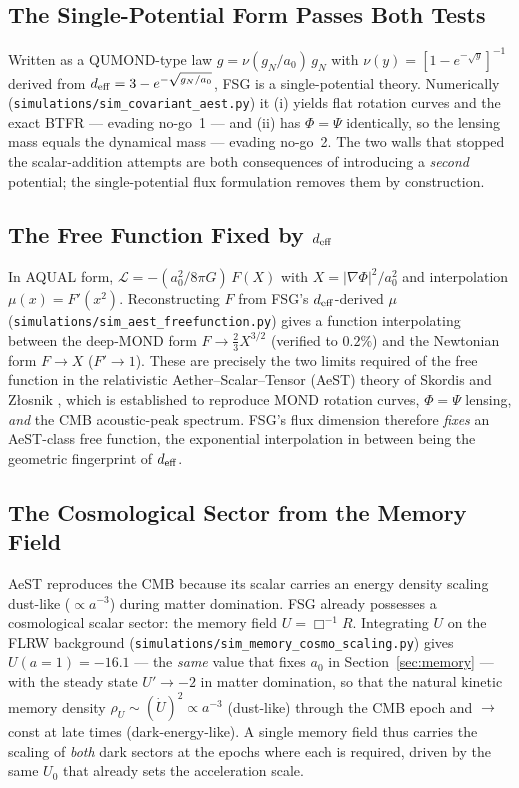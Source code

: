 \documentclass[11pt,a4paper]{article}
\begin{document}
\begin{onehalfspacing}
\subsection{The Single-Potential Form Passes Both Tests}
Written as a QUMOND-type law $g=\nu(g_N/a_0)\,g_N$ with $\nu(y)=[1-e^{-\sqrt{y}}]^{-1}$ derived from $d_{\rm eff}=3-e^{-\sqrt{g_N/a_0}}$, FSG is a single-potential theory. Numerically (\texttt{simulations/sim\_covariant\_aest.py}) it (i) yields flat rotation curves and the exact BTFR --- evading no-go~1 --- and (ii) has $\Phi=\Psi$ identically, so the lensing mass equals the dynamical mass --- evading no-go~2. The two walls that stopped the scalar-addition attempts are both consequences of introducing a \emph{second} potential; the single-potential flux formulation removes them by construction.

\subsection{The Free Function Fixed by $d_{\rm eff}$}
In AQUAL form, $\mathcal{L}=-(a_0^2/8\pi G)\,F(X)$ with $X=|\nabla\Phi|^2/a_0^2$ and interpolation $\mu(x)=F'(x^2)$. Reconstructing $F$ from FSG's $d_{\rm eff}$-derived $\mu$ (\texttt{simulations/sim\_aest\_freefunction.py}) gives a function interpolating between the deep-MOND form $F\to\tfrac{2}{3}X^{3/2}$ (verified to $0.2\%$) and the Newtonian form $F\to X$ ($F'\to1$). These are precisely the two limits required of the free function in the relativistic Aether--Scalar--Tensor (AeST) theory of Skordis and Z\l osnik \cite{SkordisZlosnik2021}, which is established to reproduce MOND rotation curves, $\Phi=\Psi$ lensing, \emph{and} the CMB acoustic-peak spectrum. FSG's flux dimension therefore \emph{fixes} an AeST-class free function, the exponential interpolation in between being the geometric fingerprint of $d_{\rm eff}$.

\subsection{The Cosmological Sector from the Memory Field}
AeST reproduces the CMB because its scalar carries an energy density scaling dust-like ($\propto a^{-3}$) during matter domination. FSG already possesses a cosmological scalar sector: the memory field $U=\Box^{-1}R$. Integrating $U$ on the FLRW background (\texttt{simulations/sim\_memory\_cosmo\_scaling.py}) gives $U(a{=}1)=-16.1$ --- the \emph{same} value that fixes $a_0$ in Section~\ref{sec:memory} --- with the steady state $U'\to-2$ in matter domination, so that the natural kinetic memory density $\rho_U\sim(\dot U)^2\propto a^{-3}$ (dust-like) through the CMB epoch and $\to\,$const at late times (dark-energy-like). A single memory field thus carries the scaling of \emph{both} dark sectors at the epochs where each is required, driven by the same $U_0$ that already sets the acceleration scale.


\end{onehalfspacing}
\end{document}
